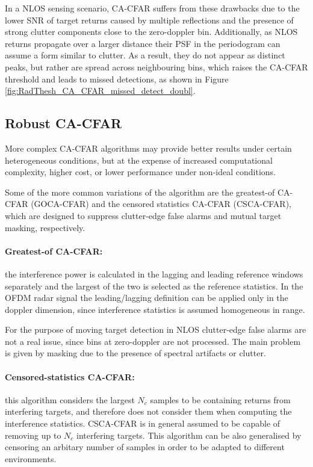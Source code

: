 	In a NLOS sensing scenario, CA-CFAR suffers from these drawbacks due to the lower SNR of target returns caused by multiple reflections and the presence of strong clutter components close to the zero-doppler bin. 
	Additionally, as NLOS returns propagate over a larger distance their PSF in the periodogram can assume a form similar to clutter. 
	As a result, they do not appear as distinct peaks, but rather are spread across neighbouring bins, which raises the CA-CFAR threshold and leads to missed detections, as shown in Figure \ref{fig:RadThesh_CA_CFAR_missed_detect_doubl}.

\subsection{Robust CA-CFAR}
More complex CA-CFAR algorithms may provide better results under certain heterogeneous conditions, but at the expense of increased computational complexity, higher cost, or lower performance under non-ideal conditions.

Some of the more common variations of the algorithm are the greatest-of CA-CFAR (GOCA-CFAR) and the censored statistics CA-CFAR (CSCA-CFAR), which are designed to suppress clutter-edge false alarms and mutual target masking, respectively.

\paragraph{Greatest-of CA-CFAR:}
the interference power is calculated in the lagging and leading reference windows separately and the largest of the two is selected as the reference statistics. In the OFDM radar signal the leading/lagging definition can be applied only in the doppler dimension, since interference statistics is assumed homogeneous in range.

For the purpose of moving target detection in NLOS clutter-edge false alarms are not a real issue, since bins at zero-doppler are not processed.
 The main problem is given by masking due to the presence of spectral artifacts or clutter.
 
 
\paragraph{Censored-statistics CA-CFAR:}
this algorithm considers the largest $N_c$ samples to be containing returns from interfering targets, and therefore does not consider them when computing the interference statistics. CSCA-CFAR is in general assumed to be capable of removing up to $N_c$ interfering targets.
This algorithm can be also generalised by censoring an arbitary number of samples in order to be adapted to different environments. 

